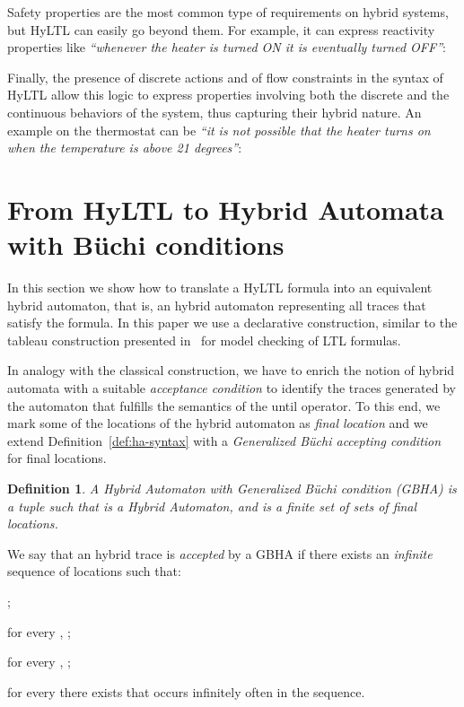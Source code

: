 \documentclass[submission,copyright,creativecommons]{eptcs}
\newcommand{\hyltl}{\textsf{HyLTL}\xspace}
\newcommand{\ltl}{\textsf{LTL}\xspace}
\newtheorem{definition}{Definition}
\renewcommand{\quote}[1]{\emph{``#1''}}
\begin{document}
\noindent Safety properties are the most common type of requirements on hybrid systems, but \hyltl can easily go beyond them. For example, it can express reactivity properties like \quote{whenever the heater is turned ON it is eventually turned OFF}:


\noindent Finally, the presence of discrete actions and of flow constraints in the syntax of \hyltl allow this logic to express properties involving both the discrete and the continuous behaviors of the system, thus capturing their hybrid nature. An example on the thermostat can be \quote{it is not possible that the heater turns on when the temperature is above 21 degrees}:







\section{From \hyltl to Hybrid Automata with B\"uchi conditions}

In this section we show how to translate a \hyltl formula into an equivalent hybrid automaton, that is, an hybrid automaton representing all traces that satisfy the formula. In this paper we use a declarative construction, similar to the tableau construction presented in~\cite{mcbook} for model checking of \ltl formulas. 

In analogy with the classical construction, we have to enrich the notion of hybrid automata with a suitable \emph{acceptance condition} to identify the traces generated by the automaton that fulfills the semantics of the until operator. To this end, we mark some of the locations of the hybrid automaton as \emph{final location} and we extend Definition~\ref{def:ha-syntax} with a \emph{Generalized B\"uchi accepting condition} for final locations.

\begin{definition}\label{def:ha-buechi}
 A \emph{Hybrid Automaton with Generalized B\"uchi condition (GBHA)} is a tuple   such that  is a Hybrid Automaton, and  \linebreak  is a finite set of sets of final locations.
\end{definition}

We say that an hybrid trace  is \emph{accepted} by a GBHA  if there exists an \emph{infinite} sequence of locations  such that:
\begin{compactenum}[(i)]
\item ;
\item for every , ; 
\item for every , ;
\item for every  there exists  that occurs infinitely often in the sequence.
\end{compactenum}
\end{document}
